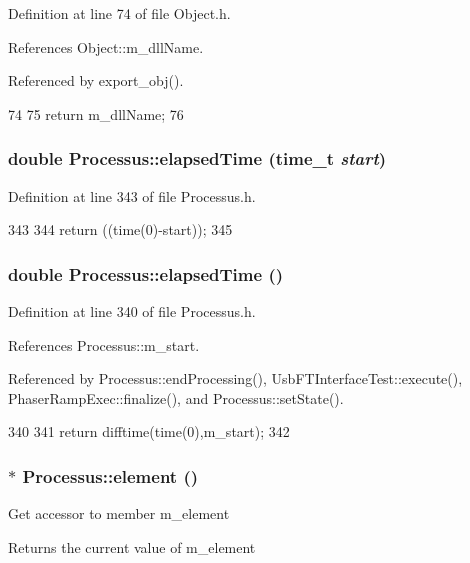 Definition at line 74 of file Object.h.

References Object::m\_\-dllName.

Referenced by export\_\-obj().


\begin{DoxyCode}
74                        {
75     return m_dllName;
76   }  
\end{DoxyCode}
\hypertarget{classProcessus_a06d3815ad56593dfd0d3c1f534f8b146}{
\subsubsection[{elapsedTime}]{\setlength{\rightskip}{0pt plus 5cm}double Processus::elapsedTime (time\_\-t {\em start})}}
\label{classProcessus_a06d3815ad56593dfd0d3c1f534f8b146}


Definition at line 343 of file Processus.h.


\begin{DoxyCode}
343                                    {
344     return ((time(0)-start));
345   }
\end{DoxyCode}
\hypertarget{classProcessus_aecca96218c65bc805c988cd95447df55}{
\subsubsection[{elapsedTime}]{\setlength{\rightskip}{0pt plus 5cm}double Processus::elapsedTime ()}}
\label{classProcessus_aecca96218c65bc805c988cd95447df55}


Definition at line 340 of file Processus.h.

References Processus::m\_\-start.

Referenced by Processus::endProcessing(), UsbFTInterfaceTest::execute(), PhaserRampExec::finalize(), and Processus::setState().


\begin{DoxyCode}
340                        {
341     return difftime(time(0),m_start);
342   }
\end{DoxyCode}
\hypertarget{classProcessus_a6fe155527431a7190b7d44d600b9608d}{
\subsubsection[{element}]{$\ast$ Processus::element ()}}
\label{classProcessus_a6fe155527431a7190b7d44d600b9608d}
Get accessor to member m\_\-element \begin{DoxyReturn}{Returns}
the current value of m\_\-element 
\end{DoxyReturn}



